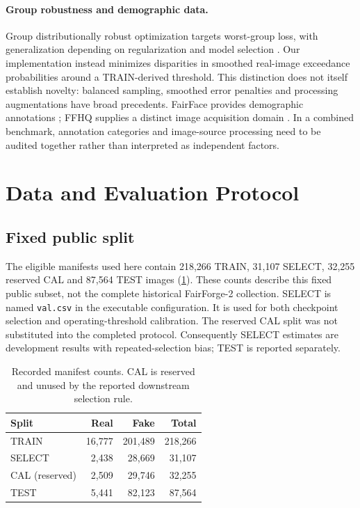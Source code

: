 \documentclass[10pt,twocolumn,letterpaper]{article}
\begin{document}
\paragraph{Group robustness and demographic data.}
Group distributionally robust optimization targets worst-group loss, with generalization depending on
regularization and model selection \cite{sagawa2020}. Our implementation instead minimizes disparities
in smoothed real-image exceedance probabilities around a TRAIN-derived threshold.
This distinction does not itself establish novelty: balanced sampling, smoothed error penalties and processing
augmentations have broad precedents. FairFace provides demographic annotations \cite{karkkainen2021};
FFHQ supplies a distinct image acquisition domain \cite{karras2019}. In a combined benchmark, annotation
categories and image-source processing need to be audited together rather than interpreted as independent factors.

\section{Data and Evaluation Protocol}
\subsection{Fixed public split}
The eligible manifests used here contain 218,266 TRAIN, 31,107 SELECT, 32,255 reserved CAL and 87,564 TEST images
(\cref{tab:split}). These counts describe this fixed public subset, not the complete historical FairForge-2 collection.
SELECT is named \texttt{val.csv} in the executable configuration. It is used for both checkpoint selection
and operating-threshold calibration. The reserved CAL split was not substituted into the completed protocol.
Consequently SELECT estimates are development results with repeated-selection bias; TEST is reported separately.

\begin{table}[t]
\centering\small
\begin{tabular}{lrrr}\toprule
Split & Real & Fake & Total\\\midrule
TRAIN & 16,777 & 201,489 & 218,266\\
SELECT & 2,438 & 28,669 & 31,107\\
CAL (reserved) & 2,509 & 29,746 & 32,255\\
TEST & 5,441 & 82,123 & 87,564\\\bottomrule
\end{tabular}
\caption{Recorded manifest counts. CAL is reserved and unused by the reported downstream selection rule.}
\label{tab:split}
\end{table}
\end{document}
